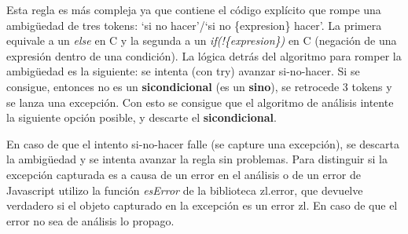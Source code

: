 \documentclass{report}
\begin{document}
	Esta regla es más compleja ya que contiene el código explícito que rompe una ambigüedad de tres tokens: `si no hacer'/`si no \{expresion\} hacer'. La primera equivale a un \textit{else} en C y la segunda a un \textit{if(!\{expresion\})} en C (negación de una expresión dentro de una condición). La lógica detrás del algoritmo para romper la ambigüedad es la siguiente: se intenta (con try) avanzar si-no-hacer. Si se consigue, entonces no es un \textbf{sicondicional} (es un \textbf{sino}), se retrocede 3 tokens y se lanza una excepción. Con esto se consigue que el algoritmo de análisis intente la siguiente opción posible, y descarte el \textbf{sicondicional}. 
	
	\vspace{10px}
	
	En caso de que el intento si-no-hacer falle (se capture una excepción), se descarta la ambigüedad y se intenta avanzar la regla sin problemas. Para distinguir si la excepción capturada es a causa de un error en el análisis o de un error de Javascript utilizo la función \textit{esError} de la biblioteca zl.error, que devuelve verdadero si el objeto capturado en la excepción es un error zl. En caso de que el error no sea de análisis lo propago.
	
	\vspace{10px}
	
\end{document}
